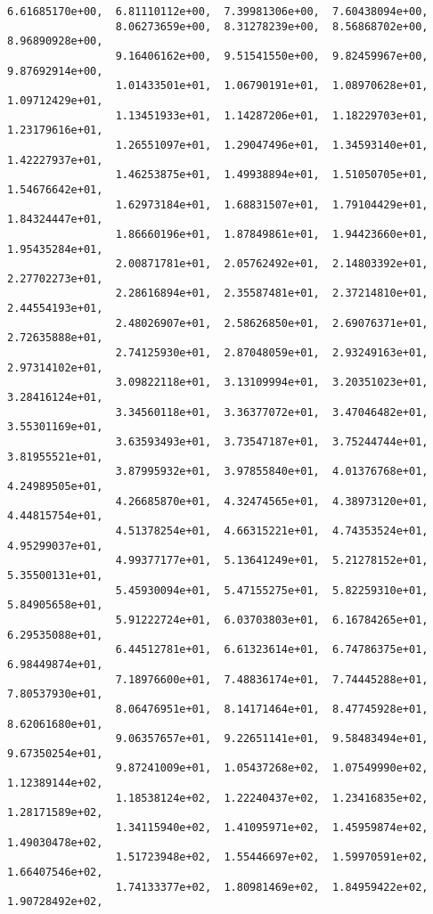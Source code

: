 \documentclass[11pt]{article}
\begin{document}
\begin{Verbatim}[commandchars=\\\{\}]
                 6.61685170e+00,  6.81110112e+00,  7.39981306e+00,  7.60438094e+00,
                 8.06273659e+00,  8.31278239e+00,  8.56868702e+00,  8.96890928e+00,
                 9.16406162e+00,  9.51541550e+00,  9.82459967e+00,  9.87692914e+00,
                 1.01433501e+01,  1.06790191e+01,  1.08970628e+01,  1.09712429e+01,
                 1.13451933e+01,  1.14287206e+01,  1.18229703e+01,  1.23179616e+01,
                 1.26551097e+01,  1.29047496e+01,  1.34593140e+01,  1.42227937e+01,
                 1.46253875e+01,  1.49938894e+01,  1.51050705e+01,  1.54676642e+01,
                 1.62973184e+01,  1.68831507e+01,  1.79104429e+01,  1.84324447e+01,
                 1.86660196e+01,  1.87849861e+01,  1.94423660e+01,  1.95435284e+01,
                 2.00871781e+01,  2.05762492e+01,  2.14803392e+01,  2.27702273e+01,
                 2.28616894e+01,  2.35587481e+01,  2.37214810e+01,  2.44554193e+01,
                 2.48026907e+01,  2.58626850e+01,  2.69076371e+01,  2.72635888e+01,
                 2.74125930e+01,  2.87048059e+01,  2.93249163e+01,  2.97314102e+01,
                 3.09822118e+01,  3.13109994e+01,  3.20351023e+01,  3.28416124e+01,
                 3.34560118e+01,  3.36377072e+01,  3.47046482e+01,  3.55301169e+01,
                 3.63593493e+01,  3.73547187e+01,  3.75244744e+01,  3.81955521e+01,
                 3.87995932e+01,  3.97855840e+01,  4.01376768e+01,  4.24989505e+01,
                 4.26685870e+01,  4.32474565e+01,  4.38973120e+01,  4.44815754e+01,
                 4.51378254e+01,  4.66315221e+01,  4.74353524e+01,  4.95299037e+01,
                 4.99377177e+01,  5.13641249e+01,  5.21278152e+01,  5.35500131e+01,
                 5.45930094e+01,  5.47155275e+01,  5.82259310e+01,  5.84905658e+01,
                 5.91222724e+01,  6.03703803e+01,  6.16784265e+01,  6.29535088e+01,
                 6.44512781e+01,  6.61323614e+01,  6.74786375e+01,  6.98449874e+01,
                 7.18976600e+01,  7.48836174e+01,  7.74445288e+01,  7.80537930e+01,
                 8.06476951e+01,  8.14171464e+01,  8.47745928e+01,  8.62061680e+01,
                 9.06357657e+01,  9.22651141e+01,  9.58483494e+01,  9.67350254e+01,
                 9.87241009e+01,  1.05437268e+02,  1.07549990e+02,  1.12389144e+02,
                 1.18538124e+02,  1.22240437e+02,  1.23416835e+02,  1.28171589e+02,
                 1.34115940e+02,  1.41095971e+02,  1.45959874e+02,  1.49030478e+02,
                 1.51723948e+02,  1.55446697e+02,  1.59970591e+02,  1.66407546e+02,
                 1.74133377e+02,  1.80981469e+02,  1.84959422e+02,  1.90728492e+02,

\end{Verbatim}
\end{document}
